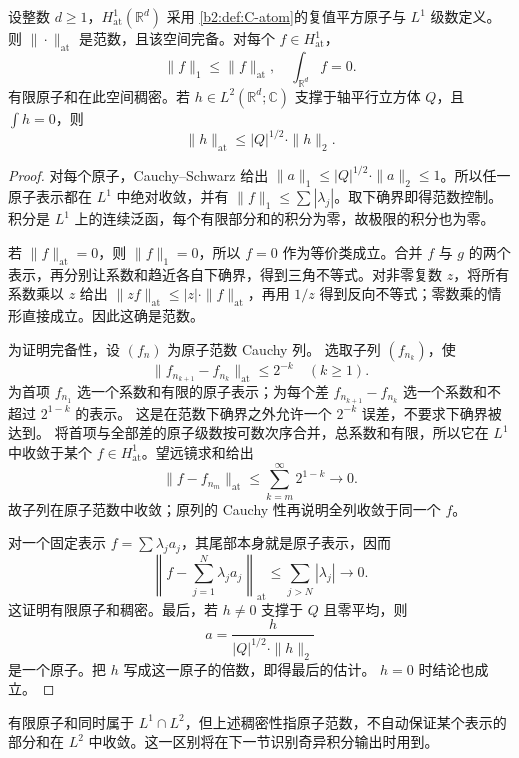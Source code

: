 \begin{proposition}[原子范数与完备性]
\label{b2:prop:C-atomic-banach}
设整数 \(d\ge1\)，\(H^1_{\mathrm{at}}(\mathbb R^d)\) 采用
\cref{b2:def:C-atom}的复值平方原子与 \(L^1\) 级数定义。
则 \(\|\cdot\|_{\mathrm{at}}\) 是范数，且该空间完备。对每个
\(f\in H^1_{\mathrm{at}}\)，
\[
 \|f\|_1\le\|f\|_{\mathrm{at}},
 \quad \int_{\mathbb R^d}f=0.
\]
有限原子和在此空间稠密。若 \(h\in L^2(\mathbb R^d;\mathbb C)\)
支撑于轴平行立方体 \(Q\)，且 \(\int h=0\)，则
\[
 \|h\|_{\mathrm{at}}\le |Q|^{1/2}\cdot\|h\|_2.
\]
\end{proposition}
\begin{proof}
对每个原子，Cauchy--Schwarz 给出
\(\|a\|_1\le |Q|^{1/2}\cdot\|a\|_2\le1\)。所以任一原子表示都在
\(L^1\) 中绝对收敛，并有
\(\|f\|_1\le\sum|\lambda_j|\)。取下确界即得范数控制。
积分是 \(L^1\) 上的连续泛函，每个有限部分和的积分为零，故极限的积分也为零。

若 \(\|f\|_{\mathrm{at}}=0\)，则 \(\|f\|_1=0\)，所以 \(f=0\)
作为等价类成立。合并 \(f\) 与 \(g\) 的两个表示，再分别让系数和趋近各自下确界，得到三角不等式。对非零复数 \(z\)，将所有系数乘以
\(z\) 给出 \(\|zf\|_{\mathrm{at}}\le |z|\cdot\|f\|_{\mathrm{at}}\)，再用
\(1/z\) 得到反向不等式；零数乘的情形直接成立。因此这确是范数。

为证明完备性，设 \((f_n)\) 为原子范数 Cauchy 列。
选取子列 \((f_{n_k})\)，使
\[
 \|f_{n_{k+1}}-f_{n_k}\|_{\mathrm{at}}\le2^{-k}
 \quad(k\ge1).
\]
为首项 \(f_{n_1}\) 选一个系数和有限的原子表示；为每个差
\(f_{n_{k+1}}-f_{n_k}\) 选一个系数和不超过 \(2^{1-k}\) 的表示。
这是在范数下确界之外允许一个 \(2^{-k}\) 误差，不要求下确界被达到。
将首项与全部差的原子级数按可数次序合并，总系数和有限，所以它在
\(L^1\) 中收敛于某个 \(f\in H^1_{\mathrm{at}}\)。望远镜求和给出
\[
 \|f-f_{n_m}\|_{\mathrm{at}}
 \le\sum_{k=m}^\infty2^{1-k}\longrightarrow0.
\]
故子列在原子范数中收敛；原列的 Cauchy 性再说明全列收敛于同一个
\(f\)。

对一个固定表示 \(f=\sum\lambda_ja_j\)，其尾部本身就是原子表示，因而
\[
 \left\|f-\sum_{j=1}^N\lambda_ja_j\right\|_{\mathrm{at}}
 \le\sum_{j>N}|\lambda_j|\longrightarrow0.
\]
这证明有限原子和稠密。最后，若 \(h\ne0\) 支撑于 \(Q\) 且零平均，则
\[
 a=\frac{h}{|Q|^{1/2}\cdot\|h\|_2}
\]
是一个原子。把 \(h\) 写成这一原子的倍数，即得最后的估计。
\(h=0\) 时结论也成立。
\end{proof}

有限原子和同时属于 \(L^1\cap L^2\)，但上述稠密性指原子范数，不自动保证某个表示的部分和在 \(L^2\) 中收敛。这一区别将在下一节识别奇异积分输出时用到。

